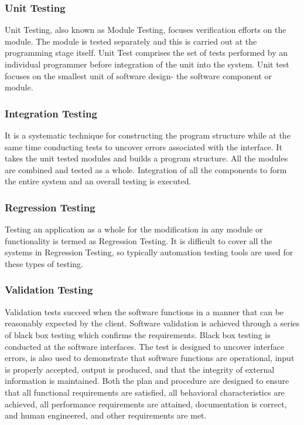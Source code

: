 \documentclass[oneside, 12pt]{book}
\begin{document}
			\subsubsection{Unit Testing}
				Unit Testing, also known as Module Testing, focuses verification efforts on the module. The module is tested separately and this is carried out at the programming stage itself. Unit Test comprises the set of tests performed by an individual programmer before integration of the unit into the system. Unit test focuses on the smallest unit of software design- the software component or module.
			\subsubsection{Integration Testing}
				It is a systematic technique for constructing the program structure while at the same time conducting tests to uncover errors associated with the interface. It takes the unit tested modules and builds a program structure. All the modules are combined and tested as a whole. Integration of all the components to form the entire system and an overall testing is executed.
			\subsubsection{Regression Testing}
				Testing an application as a whole for the modification in any module or functionality is termed as Regression Testing. It is difficult to cover all the systems in Regression Testing, so typically automation testing tools are used for these types of testing.
			\subsubsection{Validation Testing}
				Validation tests succeed when the software functions in a manner that can be reasonably expected by the client. Software validation is achieved through a series of black box testing which confirms the requirements. Black box testing is conducted at the software interfaces. The test is designed to uncover interface errors, is also used to demonstrate that software functions are operational, input is properly accepted, output is produced, and that the integrity of external information is maintained. Both the plan and procedure are designed to ensure that all functional requirements are satisfied, all behavioral characteristics are achieved, all performance requirements are attained, documentation is correct, and human engineered, and other requirements are met.
\end{document}
